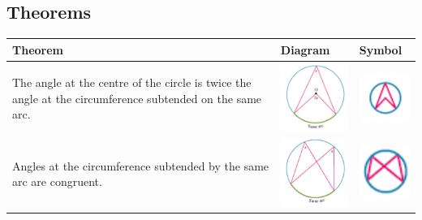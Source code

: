 \documentclass[a4paper,10pt]{report}
\begin{document}
\subsection{Theorems}
\begin{center}
	\begin{tabular}[center]{p{5cm}|p{3cm}|p{2cm}}
		Theorem                                                                                                                                                                                                                      & Diagram                                        & Symbol                                                \\ \hline
		The angle at the centre of the circle is twice the angle at the circumference subtended on the same arc.                                                                                                                     & \includegraphics[width=3cm]{circle theorem 1}  & \includegraphics[width=2cm]{circle theorem 1 symbol}  \\
		Angles at the circumference subtended by the same arc are congruent.                                                                                                                                                         & \includegraphics[width=3cm]{circle theorem 2}  & \includegraphics[width=2cm]{circle theorem 2 symbol}  \\

\end{tabular}
\end{center}
\end{document}
